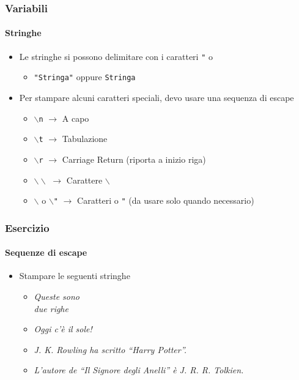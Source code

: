 \begin{contentframe}
    \frametitle{Variabili}
    \framesubtitle{Stringhe}

    \begin{itemize}
        \item Le stringhe si possono delimitare con i caratteri \texttt{"} o \textquotesingle{}
        \begin{itemize}
            \item \texttt{"Stringa"} oppure \texttt{\textquotesingle{}Stringa\textquotesingle{}}
        \end{itemize}

        \bigskip
        \item Per stampare alcuni caratteri speciali, devo usare una sequenza di escape
        \begin{itemize}
            \item \texttt{$\backslash$n} $\rightarrow$ A capo
            \item \texttt{$\backslash$t} $\rightarrow$ Tabulazione
            \item \texttt{$\backslash$r} $\rightarrow$ Carriage Return (riporta a inizio riga)
            \item \texttt{$\backslash\backslash$} $\rightarrow$ Carattere \texttt{$\backslash$}
            \item \texttt{$\backslash$\textquotesingle{}} o \texttt{$\backslash$"} $\rightarrow$ Caratteri \texttt{\textquotesingle{}} o \texttt{"} (da usare solo quando necessario)
        \end{itemize}
    \end{itemize}
\end{contentframe}

\begin{exerciseframe}
    \frametitle{Esercizio}
    \framesubtitle{Sequenze di escape}

    \begin{itemize}
        \item Stampare le seguenti stringhe
        \begin{itemize}
            \item \textit{Queste sono\\due righe}
            \smallskip
            \item \textit{Oggi c'è il sole!}
            \smallskip
            \item \textit{J. K. Rowling ha scritto ``Harry Potter''.}
            \smallskip
            \item \textit{L'autore de ``Il Signore degli Anelli'' è J. R. R. Tolkien.}
        \end{itemize}
    \end{itemize}
\end{exerciseframe}


